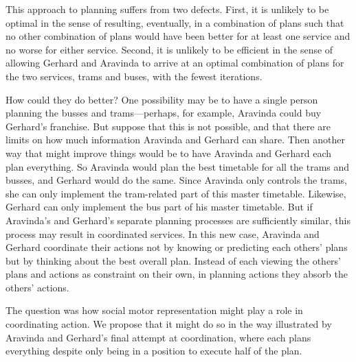 \documentclass[12pt,\papersize]{extarticle}
\begin{document}
This approach to planning suffers from two defects.
First, it is unlikely to be optimal in the sense of resulting, eventually, in a combination of plans such that no other combination of plans would have been better for at least one service and no worse for either service.
Second, it is unlikely to be efficient in the sense of allowing Gerhard and Aravinda to arrive at an optimal combination of plans for the two services, trams and buses, with the fewest iterations.%

How could they do better?
One possibility may be to have a single person planning the busses and trams---perhaps, for example, Aravinda could buy Gerhard's franchise. 
But suppose that this is not possible, and that there are limits on how much information Aravinda and Gerhard can share. 
Then another way that might improve things would be to have Aravinda and Gerhard each plan everything.
So Aravinda would plan the best timetable for all the trams and busses, and Gerhard would do the same.
Since Aravinda only controls the trams, she can only implement the tram-related part of this master timetable.
Likewise, Gerhard can only implement the bus part of his master timetable.
But if Aravinda's and Gerhard's separate planning processes are sufficiently similar, this process may result in coordinated services.
In this new case, 
Aravinda and Gerhard coordinate their actions 
not by knowing or predicting each others' plans 
but by thinking about the best overall plan.
Instead of each viewing the others' plans and actions as constraint on their own,
in planning actions they absorb the others' actions.

The question was how social motor representation might play a role in coordinating action.
We propose that it might do so in the way illustrated by Aravinda and Gerhard's final attempt at coordination,
where each plans everything despite only being in a position to execute half of the plan.
\end{document}
